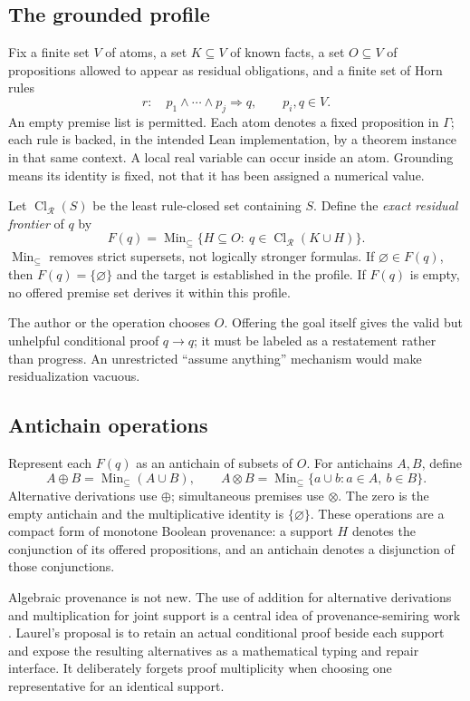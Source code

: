 \documentclass[11pt,a4paper]{article}
\newcommand{\Cl}{\operatorname{Cl}}
\newcommand{\Min}{\operatorname{Min}_{\subseteq}}
\theoremstyle{definition}
\theoremstyle{remark}
\begin{document}
\subsection{The grounded profile}
Fix a finite set $V$ of atoms, a set $K\subseteq V$ of known facts, a set $O\subseteq V$ of propositions allowed to appear as residual obligations, and a finite set of Horn rules
\[
 r:\quad p_1\land\cdots\land p_j\Longrightarrow q,
 \qquad p_i,q\in V.
\]
An empty premise list is permitted. Each atom denotes a fixed proposition in $\Gamma$; each rule is backed, in the intended Lean implementation, by a theorem instance in that same context. A local real variable can occur inside an atom. Grounding means its identity is fixed, not that it has been assigned a numerical value.

Let $\Cl_{\mathcal R}(S)$ be the least rule-closed set containing $S$. Define the \emph{exact residual frontier} of $q$ by
\begin{equation}\label{eq:frontier}
 F(q)=\Min\bigl\{H\subseteq O:\ q\in\Cl_{\mathcal R}(K\cup H)\bigr\}.
\end{equation}
$\Min$ removes strict supersets, not logically stronger formulas. If $\varnothing\in F(q)$, then $F(q)=\{\varnothing\}$ and the target is established in the profile. If $F(q)$ is empty, no offered premise set derives it within this profile.

The author or the operation chooses $O$. Offering the goal itself gives the valid but unhelpful conditional proof $q\to q$; it must be labeled as a restatement rather than progress. An unrestricted ``assume anything'' mechanism would make residualization vacuous.

\subsection{Antichain operations}
Represent each $F(q)$ as an antichain of subsets of $O$. For antichains $A,B$, define
\[
 A\oplus B=\Min(A\cup B),\qquad
 A\otimes B=\Min\{a\cup b:a\in A,\ b\in B\}.
\]
Alternative derivations use $\oplus$; simultaneous premises use $\otimes$. The zero is the empty antichain and the multiplicative identity is $\{\varnothing\}$. These operations are a compact form of monotone Boolean provenance: a support $H$ denotes the conjunction of its offered propositions, and an antichain denotes a disjunction of those conjunctions.

Algebraic provenance is not new. The use of addition for alternative derivations and multiplication for joint support is a central idea of provenance-semiring work \cite{provenance,provslides}. Laurel's proposal is to retain an actual conditional proof beside each support and expose the resulting alternatives as a mathematical typing and repair interface. It deliberately forgets proof multiplicity when choosing one representative for an identical support.
\end{document}
